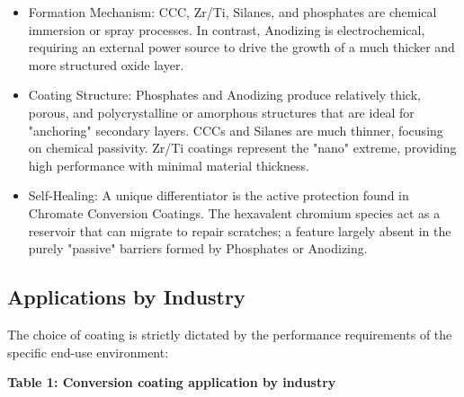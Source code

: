 \documentclass[12pt]{article}
\begin{document}
            \begin{itemize}
                \item Formation Mechanism: CCC, Zr/Ti, Silanes, and phosphates are chemical immersion or spray processes. In contrast, Anodizing is electrochemical, requiring an external power source to drive the growth of a much thicker and more structured oxide layer.
                
                \item Coating Structure: Phosphates and Anodizing produce relatively thick, porous, and polycrystalline or amorphous structures that are ideal for "anchoring" secondary layers. CCCs and Silanes are much thinner, focusing on chemical passivity. Zr/Ti coatings represent the "nano" extreme, providing high performance with minimal material thickness.
                
                \item Self-Healing: A unique differentiator is the active protection found in Chromate Conversion Coatings. The hexavalent chromium species act as a reservoir that can migrate to repair scratches; a feature largely absent in the purely "passive" barriers formed by Phosphates or Anodizing.
            \end{itemize}
        
        \subsection{Applications by Industry}

            The choice of coating is strictly dictated by the performance requirements of the specific end-use environment:

            \begin{table}[h]
                \centering
                \textbf{Table 1: Conversion coating application by industry}
                \label{coating_applications}
            \end{table}
\end{document}
